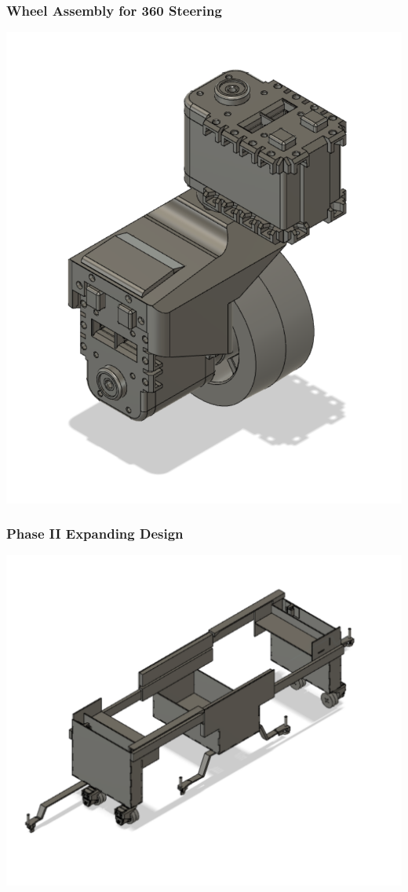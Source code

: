\documentclass[11pt, hidelinks]{report}
\begin{document}
\subsubsection{Wheel Assembly for {360\textdegree} Steering} \label{app:WheelAssembly}
	\begin{center}
	    \includegraphics[scale=.4]{WheelAssembly.png}
	\end{center}
	
\subsubsection{Phase II Expanding Design} \label{app:phasetwo}
	\begin{center}
	    \includegraphics[scale=.4]{FullDesign.png}
	\end{center}
\end{document}
